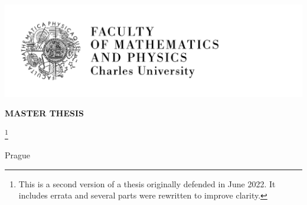 

\pagestyle{empty}
\hypersetup{pageanchor=false}
\begin{center}

\centerline{\mbox{\includegraphics[width=166mm]{../img/logo-en.pdf}}}

\vspace{-8mm}
\vfill

{\bf\Large MASTER THESIS}

\vfill

{\LARGE\ThesisAuthor}

\vspace{15mm}

{\LARGE\bfseries\ThesisTitle}\footnote{This is a second version of a thesis originally defended in June 2022. It includes errata and several parts were rewritten to improve clarity.}

\vfill

\Department

\vfill

{
\centerline{\vbox{}}}

\vfill

Prague \YearSubmitted

\end{center}

\newpage




